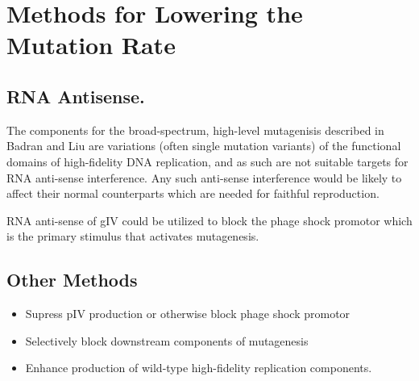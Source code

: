 \documentclass[10pt,letterpaper]{article}
\begin{document}
\section{Methods for Lowering the Mutation Rate}
\subsection*{RNA Antisense.}

The components for the broad-spectrum, high-level mutagenisis described in Badran and Liu\cite{mutation} are variations (often single mutation variants) of the functional domains of high-fidelity DNA replication, and as such are not suitable targets for RNA anti-sense interference. Any such anti-sense interference would be likely to affect their normal counterparts which are needed for faithful reproduction.

RNA anti-sense of gIV could be utilized to block the phage shock promotor which is the primary stimulus that activates mutagenesis.

\subsection*{Other Methods}
\begin{itemize}
	\item Supress pIV production or otherwise block phage shock promotor
	\item Selectively block downstream components of mutagenesis
	\item Enhance production of wild-type high-fidelity replication components.
\end{itemize}

%

\end{document}

